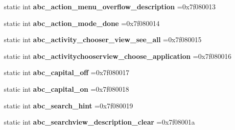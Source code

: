 \begin{DoxyCompactItemize}
\mbox{\label{classandroid_1_1support_1_1v4_1_1R_1_1string_a7c583e53b6f103b64e90079b62c9db38}} 
static int {\bfseries abc\+\_\+action\+\_\+menu\+\_\+overflow\+\_\+description} =0x7f080013
\item 
\mbox{\label{classandroid_1_1support_1_1v4_1_1R_1_1string_afa8446190e19719b415ee31e80bc9033}} 
static int {\bfseries abc\+\_\+action\+\_\+mode\+\_\+done} =0x7f080014
\item 
\mbox{\label{classandroid_1_1support_1_1v4_1_1R_1_1string_a05f157e47417028cf2490ff1c10e8df4}} 
static int {\bfseries abc\+\_\+activity\+\_\+chooser\+\_\+view\+\_\+see\+\_\+all} =0x7f080015
\item 
\mbox{\label{classandroid_1_1support_1_1v4_1_1R_1_1string_acd0dfb370af48e8d7c44f928b2ae157b}} 
static int {\bfseries abc\+\_\+activitychooserview\+\_\+choose\+\_\+application} =0x7f080016
\item 
\mbox{\label{classandroid_1_1support_1_1v4_1_1R_1_1string_a913743d0b371055eaa4461e988898fe8}} 
static int {\bfseries abc\+\_\+capital\+\_\+off} =0x7f080017
\item 
\mbox{\label{classandroid_1_1support_1_1v4_1_1R_1_1string_a1e1e1286404c39d6afa038adc4e14d33}} 
static int {\bfseries abc\+\_\+capital\+\_\+on} =0x7f080018
\item 
\mbox{\label{classandroid_1_1support_1_1v4_1_1R_1_1string_a1b9cb9bcb0313c8665a2a323cf67e1ba}} 
static int {\bfseries abc\+\_\+search\+\_\+hint} =0x7f080019
\item 
\mbox{\label{classandroid_1_1support_1_1v4_1_1R_1_1string_a7475c7c63604e865ae0ac3cf53e2ffa9}} 
static int {\bfseries abc\+\_\+searchview\+\_\+description\+\_\+clear} =0x7f08001a
\item 
\mbox{\label{classandroid_1_1support_1_1v4_1_1R_1_1string_a46a488eecfe03fc6ebe052cdc77fd4db}} 

\end{DoxyCompactItemize}
